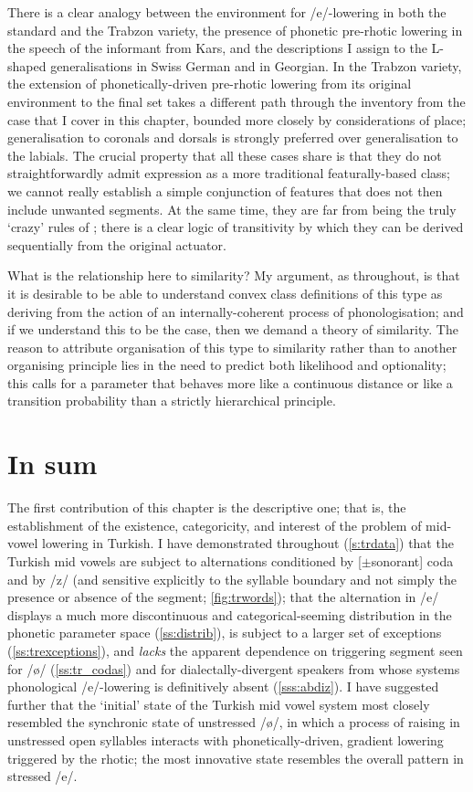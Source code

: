 There is a clear analogy between the environment for /e/-lowering in both the standard and the Trabzon variety, the presence of phonetic pre-rhotic lowering in the speech of the informant from Kars, and the descriptions I assign to the L-shaped generalisations in Swiss German and in Georgian. In the Trabzon variety, the extension of phonetically-driven pre-rhotic lowering from its original environment to the final set takes a different path through the inventory from the case that I cover in this chapter, bounded more closely by considerations of place; generalisation to coronals and dorsals is strongly preferred over generalisation to the labials. The crucial property that all these cases share is that they do not straightforwardly admit expression as a more traditional featurally-based class; we cannot really establish a simple conjunction of features that does not then include unwanted segments. At the same time, they are far from being the truly `crazy' rules of \citet{Bach1972}; there is a clear logic of transitivity by which they can be derived sequentially from the original actuator.

What is the relationship here to similarity? My argument, as throughout, is that it is desirable to be able to understand convex class definitions of this type as deriving from the action of an internally-coherent process of phonologisation; and if we understand this to be the case, then we demand a theory of similarity. The reason to attribute organisation of this type to similarity rather than to another organising principle lies in the need to predict both likelihood and optionality; this calls for a parameter that behaves more like a continuous distance or like a transition probability than a strictly hierarchical principle.

\section{In sum}

The first contribution of this chapter is the descriptive one; that is, the establishment of the existence, categoricity, and interest of the problem of mid-vowel lowering in Turkish. I have demonstrated throughout (\cref{s:trdata}) that the Turkish mid vowels are subject to alternations conditioned by [$\pm$sonorant] coda and by /z/ (and sensitive explicitly to the syllable boundary and not simply the presence or absence of the segment; \cref{fig:trwords}); that the alternation in /e/ displays a much more discontinuous and categorical-seeming distribution in the phonetic parameter space (\cref{ss:distrib}), is subject to a larger set of exceptions (\cref{ss:trexceptions}), and \emph{lacks} the apparent dependence on triggering segment seen for /\o/ (\cref{ss:tr_codas}) and for dialectally-divergent speakers from whose systems phonological /e/-lowering is definitively absent (\cref{sss:abdiz}). I have suggested further that the `initial' state of the Turkish mid vowel system most closely resembled the synchronic state of unstressed /\o/, in which a process of raising in unstressed open syllables interacts with phonetically-driven, gradient lowering triggered by the rhotic; the most innovative state resembles the overall pattern in stressed /e/.


